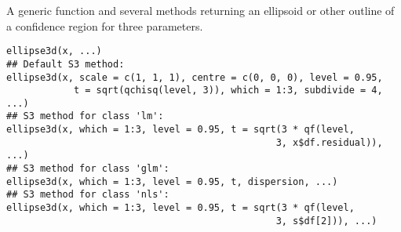 \documentclass{article}
\begin{document}
\begin{Description}\relax
A generic function and several methods
returning an ellipsoid or other outline of a confidence region
for three parameters.
\end{Description}
\begin{Usage}
\begin{verbatim}
ellipse3d(x, ...)
## Default S3 method:
ellipse3d(x, scale = c(1, 1, 1), centre = c(0, 0, 0), level = 0.95, 
            t = sqrt(qchisq(level, 3)), which = 1:3, subdivide = 4, ...)
## S3 method for class 'lm':
ellipse3d(x, which = 1:3, level = 0.95, t = sqrt(3 * qf(level, 
                                                3, x$df.residual)), ...)     
## S3 method for class 'glm':
ellipse3d(x, which = 1:3, level = 0.95, t, dispersion, ...) 
## S3 method for class 'nls':
ellipse3d(x, which = 1:3, level = 0.95, t = sqrt(3 * qf(level, 
                                                3, s$df[2])), ...) 
\end{verbatim}
\end{Usage}
\end{document}
